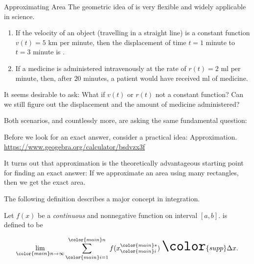 \documentclass[../main.tex]{subfiles}
\begin{document}
\begin{lesson}{Approximating Area}
  The geometric idea of  is very flexible and widely applicable in science.  

  \begin{enumerate}[wide]
    \item If the velocity of an object (travelling in a straight line) is a constant function \(v(t) = 5\) km per minute, then the displacement of time \(t = 1\) minute to \(t = 3\) minute is \underline{\hspace{2in}}.

    \item If a medicine is administered intravenously at the rate of \(r(t) = 2\) ml per minute, then, after \(20\) minutes, a patient would have received \underline{\hspace{3in}} ml of medicine.
  \end{enumerate}

  It seems desirable to ask: What if \(v(t)\) or \(r(t)\) not a constant function? Can we still figure out the displacement and the amount of medicine administered?

  Both scenarios, and countlessly more, are asking the same fundamental  question:

  
  Before we look for an exact answer, consider a practical idea: Approximation. \\
  \url{https://www.geogebra.org/calculator/bsdvzx3f}

  It turns out that approximation is the theoretically advantageous starting point for finding an exact answer: If we approximate an area using \underline{\hspace{2in}} many rectangles, then we get the exact area.
  
  The following definition describes a major concept in integration. 

  \begin{mdframed}[style=withref-compact]
    Let \(f(x)\) be a \emph{continuous} and nonnegative function on interval \([a,b]\).  is defined to be
    
    \begin{equation} \label{eq:area-under-the-curve} \huge
      \lim_{{\color{main}n} \to \infty} \sum_{{\color{main}i}=1}^{{\color{main}n}} f(x_{{\color{main}i}}^{{\color{main}*}}) \; {\color{supp} \Delta x}.
    \end{equation}


\end{mdframed}
\end{lesson}
\end{document}
